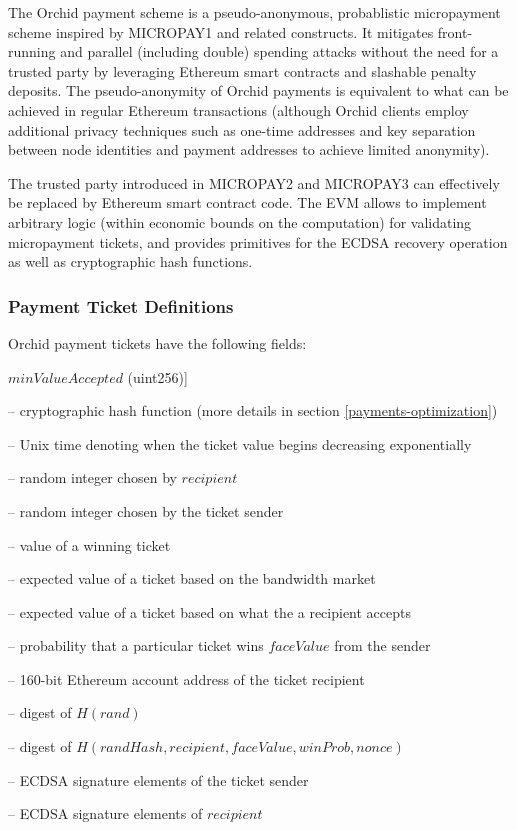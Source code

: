 The Orchid payment scheme is a pseudo-anonymous, probablistic micropayment scheme inspired by MICROPAY1 and related constructs. It mitigates front-running and parallel (including double) spending attacks without the need for a trusted party by leveraging Ethereum smart contracts and slashable penalty deposits. The pseudo-anonymity of Orchid payments is equivalent to what can be achieved in regular Ethereum transactions (although Orchid clients employ additional privacy techniques such as one-time addresses and key separation between node identities and payment addresses to achieve limited anonymity).

The trusted party introduced in MICROPAY2 and MICROPAY3 can effectively be replaced by Ethereum smart contract code. The EVM allows to implement arbitrary logic (within economic bounds on the computation) for validating micropayment tickets, and provides primitives\cite{ETHSpec} for the ECDSA\cite{ECDSA} recovery operation as well as cryptographic hash functions.

\subsubsection{Payment Ticket Definitions}
\label{payments-definitions}

Orchid payment tickets have the following fields:

\begin{labeling}{$minValueAccepted$ (uint256)]}
  \item [$H$ (function)] -- cryptographic hash function (more details in section \ref{payments-optimization})
  \item [$timestamp$ (uint32)] -- Unix time denoting when the ticket value begins decreasing exponentially
  \item [$rand$ (uint256)] -- random integer chosen by $recipient$
  \item [$nonce$ (uint256)] -- random integer chosen by the ticket sender
  \item [$faceValue$ (uint256)] -- value of a winning ticket
  \item [$minValueMarket$ (uint256)] -- expected value of a ticket based on the bandwidth market
  \item [$minValueAccepted$ (uint256)] -- expected value of a ticket based on what the a recipient accepts
  \item [$winProb$ (uint256)] -- probability that a particular ticket wins $faceValue$ from the sender
  \item [$recipient$ (uint160)] -- 160-bit Ethereum account address of the ticket recipient
  \item [$randHash$ (uint256)] -- digest of $H(rand)$
  \item [$ticketHash$ (uint256)] -- digest of $H(randHash, recipient, faceValue, winProb, nonce)$
  \item [$(v1, r1, s1)$ (tuple)] -- ECDSA signature elements of the ticket sender
  \item [$(v2, r2, s2)$ (tuple)] -- ECDSA signature elements of $recipient$
\end{labeling}

